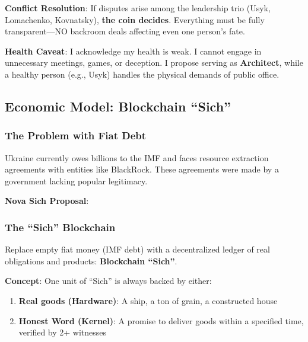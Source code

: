 \documentclass[11pt,a4paper]{article}
\theoremstyle{definition}
\theoremstyle{remark}
\begin{document}
\textbf{Conflict Resolution}: If disputes arise among the leadership trio (Usyk, Lomachenko, Kovnatsky), \textbf{the coin decides}. Everything must be fully transparent—NO backroom deals affecting even one person's fate.

\textbf{Health Caveat}: I acknowledge my health is weak. I cannot engage in unnecessary meetings, games, or deception. I propose serving as \textbf{Architect}, while a healthy person (e.g., Usyk) handles the physical demands of public office.

\subsection{Economic Model: Blockchain ``Sich''}

\subsubsection{The Problem with Fiat Debt}

Ukraine currently owes billions to the IMF and faces resource extraction agreements with entities like BlackRock. These agreements were made by a government lacking popular legitimacy.

\textbf{Nova Sich Proposal}:
\begin{center}
\end{center}

\subsubsection{The ``Sich'' Blockchain}

Replace empty fiat money (IMF debt) with a decentralized ledger of real obligations and products: \textbf{Blockchain ``Sich''}.

\textbf{Concept}: One unit of ``Sich'' is always backed by either:
\begin{enumerate}
\item \textbf{Real goods (Hardware)}: A ship, a ton of grain, a constructed house
\item \textbf{Honest Word (Kernel)}: A promise to deliver goods within a specified time, verified by 2+ witnesses
\end{enumerate}
\end{document}
